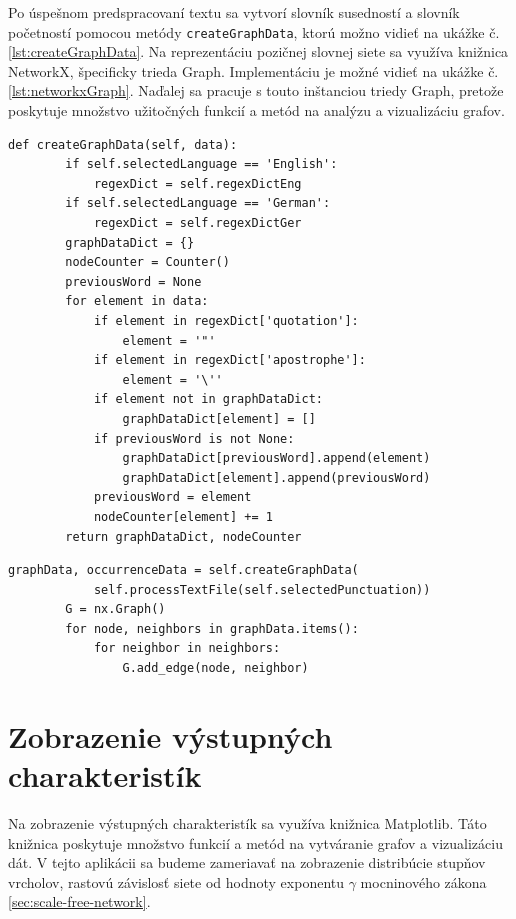 Po úspešnom predspracovaní textu sa vytvorí slovník susedností a slovník početností pomocou metódy \texttt{createGraphData}, ktorú
možno vidieť na ukážke č. \ref{lst:createGraphData}. Na reprezentáciu pozičnej slovnej siete sa využíva knižnica NetworkX, špecificky
trieda Graph. Implementáciu je možné vidieť na ukážke č. \ref{lst:networkxGraph}. Naďalej sa pracuje s touto inštanciou triedy Graph,
pretože poskytuje množstvo užitočných funkcií a metód na analýzu a vizualizáciu grafov.

\clearpage

\begin{lstlisting}[caption={Metóda pre vytvorenie pozičnej slovnej siete z predspracovaného textu.}, label={lst:createGraphData}]
    def createGraphData(self, data):
        if self.selectedLanguage == 'English':
            regexDict = self.regexDictEng
        if self.selectedLanguage == 'German':
            regexDict = self.regexDictGer
        graphDataDict = {}
        nodeCounter = Counter()
        previousWord = None
        for element in data:
            if element in regexDict['quotation']:
                element = '"'
            if element in regexDict['apostrophe']:
                element = '\''
            if element not in graphDataDict:
                graphDataDict[element] = []
            if previousWord is not None:
                graphDataDict[previousWord].append(element)
                graphDataDict[element].append(previousWord)
            previousWord = element
            nodeCounter[element] += 1
        return graphDataDict, nodeCounter
\end{lstlisting}

\begin{lstlisting}[caption={Vytvorenie inštancie triedy NetworkX.Graph.}, label={lst:networkxGraph}]
    graphData, occurrenceData = self.createGraphData(
            self.processTextFile(self.selectedPunctuation))
        G = nx.Graph()
        for node, neighbors in graphData.items():
            for neighbor in neighbors:
                G.add_edge(node, neighbor)
\end{lstlisting}

\section{Zobrazenie výstupných charakteristík}\label{sec:graphicalOutput}

Na zobrazenie výstupných charakteristík sa využíva knižnica Matplotlib. Táto knižnica poskytuje množstvo funkcií
a metód na vytváranie grafov a vizualizáciu dát. V tejto aplikácii sa budeme zameriavať na zobrazenie distribúcie stupňov
vrcholov, rastovú závislosť siete od hodnoty exponentu $\gamma$ mocninového zákona \ref{sec:scale-free-network}.

